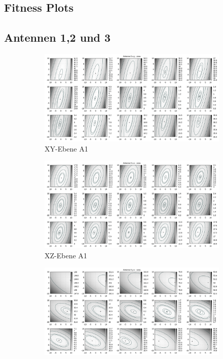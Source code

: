 \begin{appendix}
\chapter{Fitness Plots}

\newpage
\begin{landscape}
\section{Antennen 1,2 und 3}
\label{app:fitness:plots1}
\begin{figure}[!ht]
	\centering
	\begin{subfigure}[t]{0.5\textheight}
	     \centering
	     \includegraphics[width=\textwidth]{img/fitness/xy/a0.png}
	             \caption{XY-Ebene A1}
	\end{subfigure}
	\begin{subfigure}[t]{0.5\textheight}
		\centering
	     \includegraphics[width=\textwidth]{img/fitness/xz/a0.png}
				\caption{XZ-Ebene A1}
	\end{subfigure}
	\begin{subfigure}[t]{0.5\textheight}
			\centering
	   \includegraphics[width=\textwidth]{img/fitness/yz/a0.png}

\end{subfigure}
\end{figure}
\end{landscape}
\end{appendix}
